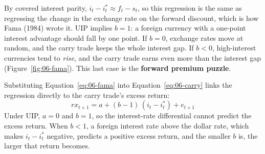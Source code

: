 By covered interest parity, $i_t - i^*_t \approx f_t - s_t$, so this regression is the same as regressing the change in the exchange rate on the forward discount, which is how Fama (1984) wrote it. UIP implies $b = 1$: a foreign currency with a one-point interest advantage should fall by one point. If $b = 0$, exchange rates move at random, and the carry trade keeps the whole interest gap. If $b < 0$, high-interest currencies tend to \emph{rise}, and the carry trade earns even more than the interest gap (Figure~\ref{fig:06-fama}). This last case is the \textbf{forward premium puzzle}.

Substituting Equation~\eqref{eq:06-fama} into Equation~\eqref{eq:06-carry} links the regression directly to the carry trade's excess return:
\begin{equation}
  rx_{t+1} = a + (b - 1)\,(i_t - i^*_t) + e_{t+1}
  \label{eq:06-carry-fama}
\end{equation}
Under UIP, $a = 0$ and $b = 1$, so the interest-rate differential cannot predict the excess return. When $b < 1$, a foreign interest rate above the dollar rate, which makes $i_t - i^*_t$ negative, predicts a positive excess return, and the smaller $b$ is, the larger that return becomes.


